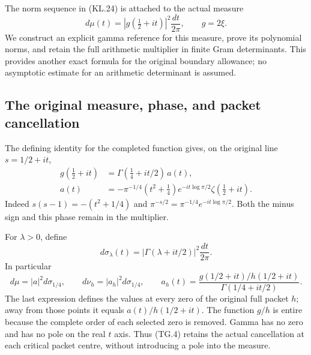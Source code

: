 The norm sequence in (KL.24) is attached to the actual measure
\[
 d\mu(t)=|g(\tfrac12+it)|^2\frac{dt}{2\pi},\qquad g=2\xi.
                                                               \tag{TG.1}
\]
We construct an explicit gamma reference for this measure, prove its
polynomial norms, and retain the full arithmetic multiplier in finite
Gram determinants.  This provides another exact formula for the
original boundary allowance; no asymptotic estimate for an arithmetic
determinant is assumed.

\subsection{The original measure, phase, and packet cancellation}

The defining identity for the completed function gives, on the original
line \(s=1/2+it\),
\[
 \begin{aligned}
 g(\tfrac12+it)&=\Gamma(\tfrac14+it/2)\,a(t),\\
 a(t)&=-\pi^{-1/4}(t^2+\tfrac14)
           e^{-it\log\pi/2}\zeta(\tfrac12+it).
 \end{aligned}                                                   \tag{TG.2}
\]
Indeed \(s(s-1)=-(t^2+1/4)\) and
\(\pi^{-s/2}=\pi^{-1/4}e^{-it\log\pi/2}\).  Both the minus
sign and this phase remain in the multiplier.

For \(\lambda>0\), define
\[
 d\sigma_\lambda(t)=|\Gamma(\lambda+it/2)|^2\frac{dt}{2\pi}.
                                                               \tag{TG.3}
\]
In particular
\[
 d\mu=|a|^2d\sigma_{1/4},\qquad
 d\nu_h=|a_h|^2d\sigma_{1/4},\qquad
 a_h(t)=\frac{g(1/2+it)/h(1/2+it)}{\Gamma(1/4+it/2)}.
                                                               \tag{TG.4}
\]
The last expression defines the values at every zero of the original
full packet \(h\); away from those points it equals
\(a(t)/h(1/2+it)\).  The function \(g/h\) is entire because
the complete order of each selected zero is removed.  Gamma has no
zero and has no pole on the real \(t\) axis.  Thus (TG.4) retains
the actual cancellation at each critical packet centre, without
introducing a pole into the measure.

